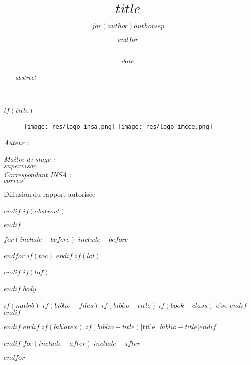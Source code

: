 \documentclass[$if(fontsize)$$fontsize$,$endif$$if(lang)$$lang$,$endif$$if(papersize)$$papersize$,$endif$$for(classoption)$$classoption$$sep$,$endfor$]{$documentclass$}
\title{ 
		\HRule{0.5pt} \\ [0.5cm]
        \LARGE \textbf{\uppercase{$title$}}
        \HRule{0.5pt} \\ [0.5cm]
        \vspace*{2\baselineskip}
		}
\author{$for(author)$$author$$sep$ \and $endfor$ \\\vspace{0.5em}{\large $school$} \\\vspace{0.5em}{\large $dpt$}}
\date{$date$}
\makeatletter
\renewcommand*{\maketitle}{
\begin{titlepage}
	\begin{figure}[tbp]\centering
            \texttt{[image: res/logo\_insa.png]}	
        \hfill
            \texttt{[image: res/logo\_imcce.png]}
    \end{figure}
	
	\begin{center}
		\@date 
		{\LARGE\@title\unskip\strut\par} \vspace{2cm}

	\begin{minipage}[t]{0.3\textwidth}
	\begin{flushleft} \large
		\emph{Auteur :}\\
		\@author 
	\end{flushleft}
	\end{minipage}
	\begin{minipage}[t]{0.6\textwidth}
	\begin{flushright} \large
		\emph{Maître de stage :} \\
		$supervisor$ \\
		\vspace{1em}
		\emph{Correspondant INSA :} \\
		$corres$
	\end{flushright}
	\end{minipage}

	\vfill

	{\large Diffusion du rapport autorisée}

	\end{center}
	
\end{titlepage}
}
\makeatother
\begin{document}
{}

$if(title)$
\maketitle
$endif$
$if(abstract)$
\begin{abstract}
$abstract$
\end{abstract}
$endif$

$for(include-before)$
$include-before$

{}

$endfor$
$if(toc)$
{
\hypersetup{linkcolor=black}
\setcounter{tocdepth}{$toc-depth$}
\tableofcontents
}
$endif$
$if(lot)$
\listoftables
$endif$
$if(lof)$
\listoffigures
$endif$
$body$

$if(natbib)$
$if(biblio-files)$
$if(biblio-title)$
$if(book-class)$
\renewcommand\bibname{$biblio-title$}
$else$
\renewcommand\refname{$biblio-title$}
$endif$
$endif$


$endif$
$endif$
$if(biblatex)$
\printbibliography$if(biblio-title)$[title=$biblio-title$]$endif$

$endif$
$for(include-after)$
$include-after$

$endfor$
\end{document}
